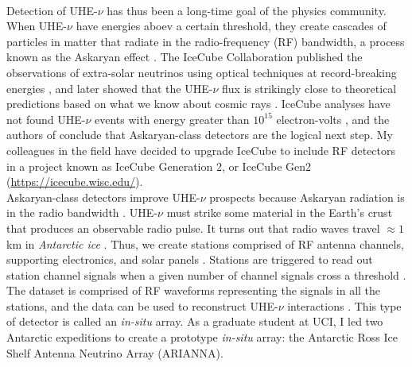 \documentclass[../../main.tex]{subfiles}
\begin{document}
\\
\vspace{0.25cm}
Detection of UHE-$\nu$ has thus been a long-time goal of the physics community.  When UHE-$\nu$ have energies aboev a certain threshold, they create cascades of particles in matter that radiate in the radio-frequency (RF) bandwidth, a process known as the Askaryan effect \cite{ask1} \cite{ask2} \cite{PhysRevLett.86.2802} \cite{PhysRevLett.99.171101, PhysRevD.101.083005}.  The IceCube Collaboration published the observations of extra-solar neutrinos using optical techniques at record-breaking energies \cite{PhysRevLett.111.021103}, and later showed that the UHE-$\nu$ flux is strikingly close to theoretical predictions based on what we know about cosmic rays \cite{Aartsen_2015} \cite{WB}.  IceCube analyses have not found UHE-$\nu$ events with energy greater than $10^{15}$ electron-volts \cite{PhysRevD.98.062003}, and the authors of \cite{PhysRevD.98.062003} conclude that Askaryan-class detectors are the logical next step.  My colleagues in the field have decided to upgrade IceCube to include RF detectors in a project known as IceCube Generation 2, or IceCube Gen2 (\url{https://icecube.wisc.edu/}).
\\
\vspace{0.25cm}
Askaryan-class detectors improve UHE-$\nu$ prospects because Askaryan radiation is in the radio bandwidth \cite{10.1016/j.astropartphys.2017.03.008}.  UHE-$\nu$ must strike some material in the Earth's crust that produces an observable radio pulse.  It turns out that radio waves travel $\approx 1$ km in \textit{Antarctic ice} \cite{10.3189/2015jog14j214} \cite{10.3189/2015jog15j057} \cite{barwick_besson_gorham_saltzberg_2005}.  Thus, we create stations comprised of RF antenna channels, supporting electronics, and solar panels \cite{10.1109/tns.2015.2468182}.  Stations are triggered to read out station channel signals when a given number of channel signals cross a threshold \cite{sst}.  The dataset is comprised of RF waveforms representing the signals in all the stations, and the data can be used to reconstruct UHE-$\nu$ interactions \cite{10.1088/1475-7516/2019/11/030} \cite{10.1088/1748-0221/15/09/p09039}.  This type of detector is called an \textit{in-situ} array.  As a graduate student at UCI, I led two Antarctic expeditions to create a prototype \textit{in-situ} array: the Antarctic Ross Ice Shelf Antenna Neutrino Array (ARIANNA).
\\
\vspace{0.25cm}
\end{document}

